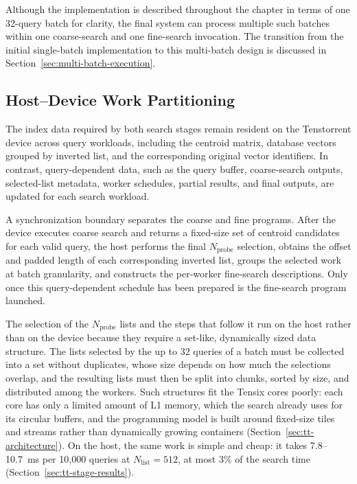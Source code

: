 Although the implementation is described throughout the chapter in terms of one 32-query batch for clarity, the final system can process multiple such batches within one coarse-search and one fine-search invocation. The transition from the initial single-batch implementation to this multi-batch design is discussed in Section~\ref{sec:multi-batch-execution}.

\subsection{Host--Device Work Partitioning}
\label{subsec:host-device-responsibilities}

The index data required by both search stages remain resident on the Tenstorrent device across query workloads, including the centroid matrix, database vectors grouped by inverted list, and the corresponding original vector identifiers. In contrast, query-dependent data, such as the query buffer, coarse-search outputs, selected-list metadata, worker schedules, partial results, and final outputs, are updated for each search workload.

A synchronization boundary separates the coarse and fine programs. After the device executes coarse search and returns a fixed-size set of centroid candidates for each valid query, the host performs the final \(N_{\mathrm{probe}}\) selection, obtains the offset and padded length of each corresponding inverted list, groups the selected work at batch granularity, and constructs the per-worker fine-search descriptions. Only once this query-dependent schedule has been prepared is the fine-search program launched.

The selection of the \(N_{\mathrm{probe}}\) lists and the steps that follow it run on the host rather than on the device because they require a set-like, dynamically sized data structure. The lists selected by the up to 32 queries of a batch must be collected into a set without duplicates, whose size depends on how much the selections overlap, and the resulting lists must then be split into chunks, sorted by size, and distributed among the workers. Such structures fit the Tensix cores poorly: each core has only a limited amount of L1 memory, which the search already uses for its circular buffers, and the programming model is built around fixed-size tiles and streams rather than dynamically growing containers (Section~\ref{sec:tt-architecture}). On the host, the same work is simple and cheap: it takes 7.8--10.7~ms per 10,000 queries at \(N_{\mathrm{list}}=512\), at most 3\% of the search time (Section~\ref{sec:tt-stage-results}).

